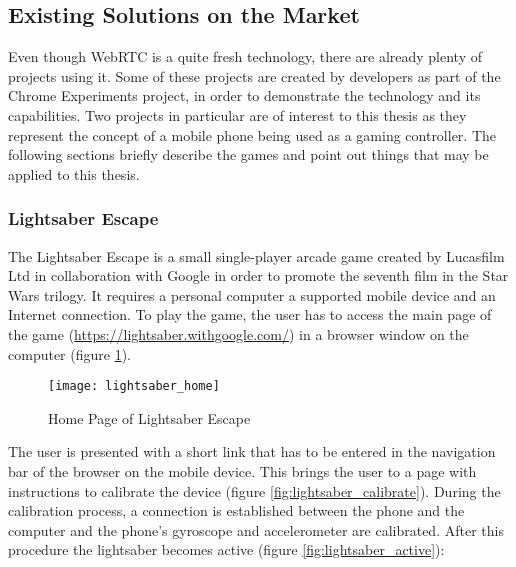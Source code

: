 


\subsection{Existing Solutions on the Market}

Even though WebRTC is a quite fresh technology, there are already plenty of
projects using it. Some of these projects are created by developers as part of
the Chrome Experiments\cite{chromeexperiments} project, in order to demonstrate
the technology and its capabilities. Two projects in particular are of interest
to this thesis as they represent the concept of a mobile phone being used as a
gaming controller. The following sections briefly describe the games and point
out things that may be applied to this thesis.

\subsubsection{Lightsaber Escape} %

The Lightsaber Escape\cite{lightsaber} is a small single-player arcade game
created by Lucasfilm Ltd in collaboration with Google in order to promote the
seventh film in the Star Wars trilogy. It requires a personal computer a
supported mobile device and an Internet connection. To play the game, the user
has to access the main page of the game
(\url{https://lightsaber.withgoogle.com/}) in a browser window on the computer
(figure \ref{fig:lightsaber_home}).

\begin{figure}[!h]
\centering
\texttt{[image: lightsaber\_home]}
\caption{Home Page of Lightsaber Escape}\label{fig:lightsaber_home}
\end{figure}

The user is presented with a short link that has to be entered in the navigation
bar of the browser on the mobile device. This brings the user to a page with
instructions to calibrate the device (figure \ref{fig:lightsaber_calibrate}).
During the calibration process, a connection is established between the phone
and the computer and the phone's gyroscope and accelerometer are calibrated.
After this procedure the lightsaber becomes active (figure
\ref{fig:lightsaber_active}):

